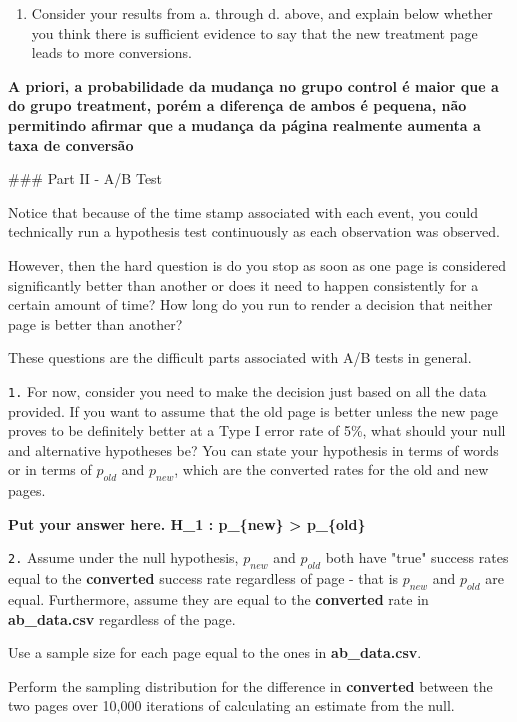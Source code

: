 \documentclass[11pt]{article}
\providecommand{\tightlist}{%
      \setlength{\itemsep}{0pt}\setlength{\parskip}{0pt}}
\begin{document}
    \begin{enumerate}
\def\labelenumi{\alph{enumi}.}
\setcounter{enumi}{4}
\tightlist
\item
  Consider your results from a. through d. above, and explain below
  whether you think there is sufficient evidence to say that the new
  treatment page leads to more conversions.
\end{enumerate}

    \textbf{A priori, a probabilidade da mudança no grupo control é maior
que a do grupo treatment, porém a diferença de ambos é pequena, não
permitindo afirmar que a mudança da página realmente aumenta a taxa de
conversão}

     \#\#\# Part II - A/B Test

Notice that because of the time stamp associated with each event, you
could technically run a hypothesis test continuously as each observation
was observed.

However, then the hard question is do you stop as soon as one page is
considered significantly better than another or does it need to happen
consistently for a certain amount of time? How long do you run to render
a decision that neither page is better than another?

These questions are the difficult parts associated with A/B tests in
general.

\texttt{1.} For now, consider you need to make the decision just based
on all the data provided. If you want to assume that the old page is
better unless the new page proves to be definitely better at a Type I
error rate of 5\%, what should your null and alternative hypotheses be?
You can state your hypothesis in terms of words or in terms of
\textbf{\(p_{old}\)} and \textbf{\(p_{new}\)}, which are the converted
rates for the old and new pages.

    \textbf{Put your answer here. H\_1 : p\_\{new\} \textgreater{}
p\_\{old\} }

    \texttt{2.} Assume under the null hypothesis, \(p_{new}\) and
\(p_{old}\) both have "true" success rates equal to the
\textbf{converted} success rate regardless of page - that is \(p_{new}\)
and \(p_{old}\) are equal. Furthermore, assume they are equal to the
\textbf{converted} rate in \textbf{ab\_data.csv} regardless of the page.

Use a sample size for each page equal to the ones in
\textbf{ab\_data.csv}.

Perform the sampling distribution for the difference in
\textbf{converted} between the two pages over 10,000 iterations of
calculating an estimate from the null.
\end{document}
